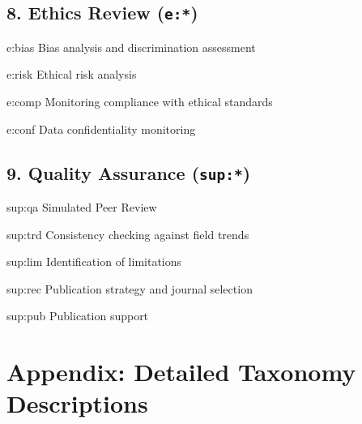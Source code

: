 \documentclass[11pt]{article}
\begin{document}
\subsection*{8. Ethics Review (\texttt{e:*})}
\begin{gaikeys}
    \item[e:bias] Bias analysis and discrimination assessment
    \item[e:risk] Ethical risk analysis
    \item[e:comp] Monitoring compliance with ethical standards
    \item[e:conf] Data confidentiality monitoring
\end{gaikeys}

\subsection*{9. Quality Assurance (\texttt{sup:*})}
\begin{gaikeys}
    \item[sup:qa]  Simulated Peer Review
    \item[sup:trd] Consistency checking against field trends
    \item[sup:lim] Identification of limitations
    \item[sup:rec] Publication strategy and journal selection
    \item[sup:pub] Publication support
\end{gaikeys}


\printbibliography

\clearpage

\appendix

\begingroup
\makeatletter
\renewcommand\paragraph{\@startsection{paragraph}{4}{\z@}%
  {3.25ex \@plus1ex \@minus.2ex}%
  {-1em}%
  {\normalfont\normalsize\bfseries\color{blue!80!black}}} %
\makeatother


\section{Appendix: Detailed Taxonomy Descriptions}
\label{app:taxonomy}
\end{document}
